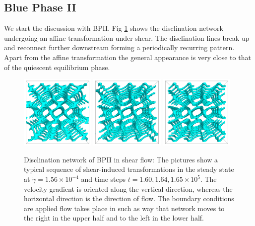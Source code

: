 \documentclass[aps,pre,reprint,superscriptaddress]{revtex4}
\newcommand{\e}[1]{\times10^{#1}}
\begin{document}
\subsection{Blue Phase II}

We start the discussion with BPII. Fig \ref{bp2-med} shows the disclination network 
undergoing an affine transformation under shear. The disclination lines break up and 
reconnect further downstream forming a periodically recurring pattern. 
Apart from the affine transformation the general appearance is very close to that 
of the quiescent equilibrium phase.

\begin{figure}[h]
\includegraphics[width=0.32\textwidth]{disc-160k_run902.png}
\includegraphics[width=0.32\textwidth]{disc-164k_run902.png}
\includegraphics[width=0.32\textwidth]{disc-165k_run902.png}
\caption{Disclination network of BPII in shear flow: The pictures show a typical sequence 
of shear-induced transformations in the steady state at 
$\dot{\gamma}=1.56\e{-4}$ and time steps $t=1.60, 1.64,1.65\e{5}$. The velocity gradient 
is oriented along the vertical direction, whereas the horizontal direction is the direction of flow. 
The boundary conditions are applied flow takes place in such as way that network moves 
to the right in the upper half and to the left in the lower half.}
\label{bp2-med}
\end{figure}
\end{document}
